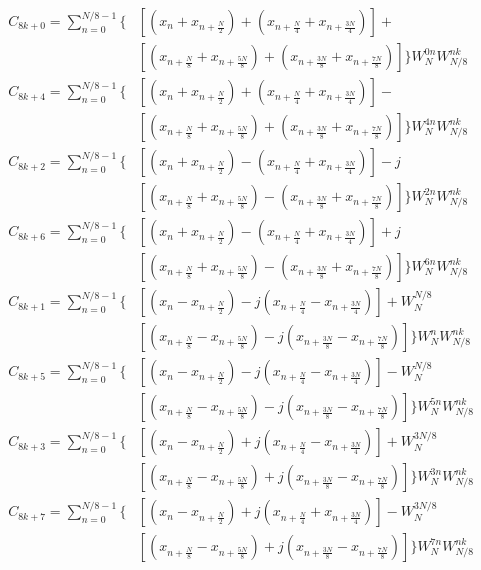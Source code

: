 \documentclass[journal,comsoc]{IEEEtran}
\begin{document}
\begingroup
\allowdisplaybreaks
\begin{small}
\begin{align}\label{eqn:radix}
C_{8k+0} = \sum_{n=0}^{N/8-1} \bigg\{&[(x_n + x_{n+\frac{N}{2}}) + (x_{n+\frac{N}{4}} + x_{n+\frac{3N}{4}})] + 	   				    \\
&[(x_{n+\frac{N}{8}} + x_{n+\frac{5N}{8}}) + (x_{n+\frac{3N}{8}} + x_{n+\frac{7N}{8}})] \bigg\} W_N^{0n} W_{N/8}^ {nk}     \nonumber\\
%	
C_{8k+4} = \sum_{n=0}^{N/8-1} \bigg\{&[(x_n + x_{n+\frac{N}{2}}) + (x_{n+\frac{N}{4}} + x_{n+\frac{3N}{4}})] - 			   \nonumber\\
&[(x_{n+\frac{N}{8}} + x_{n+\frac{5N}{8}}) + (x_{n+\frac{3N}{8}} + x_{n+\frac{7N}{8}})] \bigg\} W_N^{4n} W_{N/8}^ {nk}     \nonumber\\
%
C_{8k+2} = \sum_{n=0}^{N/8-1} \bigg\{&[(x_n + x_{n+\frac{N}{2}}) - (x_{n+\frac{N}{4}} + x_{n+\frac{3N}{4}})] -j 		   \nonumber\\
&[(x_{n+\frac{N}{8}} + x_{n+\frac{5N}{8}}) - (x_{n+\frac{3N}{8}} + x_{n+\frac{7N}{8}})] \bigg\} W_N^{2n} W_{N/8}^ {nk}     \nonumber\\
%
C_{8k+6} = \sum_{n=0}^{N/8-1} \bigg\{&[(x_n + x_{n+\frac{N}{2}}) - (x_{n+\frac{N}{4}} + x_{n+\frac{3N}{4}})] +j			   \nonumber\\
&[(x_{n+\frac{N}{8}} + x_{n+\frac{5N}{8}}) - (x_{n+\frac{3N}{8}} + x_{n+\frac{7N}{8}})] \bigg\} W_N^{6n} W_{N/8}^ {nk}     \nonumber\\
%
C_{8k+1} = \sum_{n=0}^{N/8-1} \bigg\{&[(x_n - x_{n+\frac{N}{2}}) -j (x_{n+\frac{N}{4}} - x_{n+\frac{3N}{4}})] + W_N^{N/8}  \nonumber\\
&[(x_{n+\frac{N}{8}} - x_{n+\frac{5N}{8}}) -j (x_{n+\frac{3N}{8}} - x_{n+\frac{7N}{8}})] \bigg\} W_N^{n} W_{N/8}^ {nk}     \nonumber\\
%
C_{8k+5} = \sum_{n=0}^{N/8-1} \bigg\{&[(x_n - x_{n+\frac{N}{2}}) -j (x_{n+\frac{N}{4}} - x_{n+\frac{3N}{4}})] - W_N^{N/8}  \nonumber\\
&[(x_{n+\frac{N}{8}} - x_{n+\frac{5N}{8}}) -j (x_{n+\frac{3N}{8}} - x_{n+\frac{7N}{8}})] \bigg\} W_N^{5n} W_{N/8}^ {nk}    \nonumber\\
%
C_{8k+3} = \sum_{n=0}^{N/8-1} \bigg\{&[(x_n - x_{n+\frac{N}{2}}) +j (x_{n+\frac{N}{4}} - x_{n+\frac{3N}{4}})] + W_N^{3N/8} \nonumber\\
&[(x_{n+\frac{N}{8}} - x_{n+\frac{5N}{8}}) +j (x_{n+\frac{3N}{8}} - x_{n+\frac{7N}{8}})] \bigg\} W_N^{3n} W_{N/8}^ {nk}    \nonumber\\
%
C_{8k+7} = \sum_{n=0}^{N/8-1} \bigg\{&[(x_n - x_{n+\frac{N}{2}}) +j (x_{n+\frac{N}{4}} + x_{n+\frac{3N}{4}})] - W_N^{3N/8} \nonumber\\
&[(x_{n+\frac{N}{8}} - x_{n+\frac{5N}{8}}) +j (x_{n+\frac{3N}{8}} - x_{n+\frac{7N}{8}})] \bigg\} W_N^{7n} W_{N/8}^ {nk}    \nonumber	
\end{align}
\end{small}
\endgroup
\end{document}
